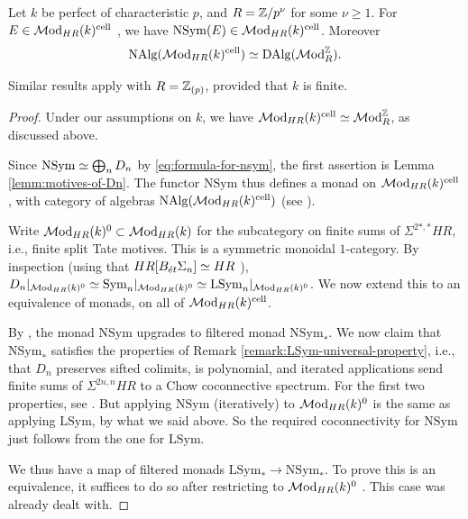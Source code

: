 \documentclass{amsart}
\renewcommand{\NB}[1]{}
\numberwithin{proposition}{section}
\numberwithin{equation}{section}
\def\cell{\mathrm{cell}}
\def\NSym{\mathrm{NSym}}
\def\LSym{\mathrm{LSym}}
\def\Sym{\mathrm{Sym}}
\def\DAlg{\mathrm{DAlg}}
\begin{document}
\begin{proposition} \label{prop:NAlg-DAlg}
Let $k$ be perfect of characteristic $p$, and $R=\mathbb{Z}/p^\nu$ for some $\nu \ge 1$.
For $E \in \Mod_{HR}(k)^\cell$ , we have $\NSym(E) \in \Mod_{HR}(k)^\cell$.
Moreover \[ \NAlg(\Mod_{HR}(k)^\cell) \wequi \DAlg(\Mod_{R}^\Z). \]

Similar results apply with $R=\mathbb{Z}_{(p)}$, provided that $k$ is finite.
\end{proposition}
\begin{proof}
Under our assumptions on $k$, we have $\Mod_{HR}(k)^\cell \wequi \Mod_{R}^\Z$, as discussed above.

Since $\NSym \wequi \bigoplus_n D_n$ by \eqref{eq:formula-for-nsym}, the first assertion is Lemma \ref{lemm:motives-of-Dn}.
The functor $\NSym$ thus defines a monad on $\Mod_{HR}(k)^\cell$, with category of algebras $\NAlg(\Mod_{HR}(k)^\cell)$ (see \cite[Theorem~4.7.3.5]{lurie-ha}).

Write $\mathcal{M}\mathrm{od}_{HR}(k)^0 \subset \mathcal{M}\mathrm{od}_{HR}(k)$ for the subcategory on finite sums of $\Sigma^{2*,*}HR$, i.e., finite split Tate motives.
This is a symmetric monoidal $1$-category.
By inspection (using that $HR[B_{\acute{e}t}\Sigma_n] \simeq HR$ \cite[Proposition 2.1(3)]{bachmann-linearity}), $D_n|_{\Mod_{HR}(k)^0} \wequi \Sym_n|_{\Mod_{HR}(k)^0} \wequi \LSym_n|_{\Mod_{HR}(k)^0}$.\NB{say more?}
We now extend this to an equivalence of monads, on all of $\Mod_{HR}(k)^\cell$.

By \cite[(proof of) Lemma 2.14]{bachmann-MHH}, the monad $\NSym$ upgrades to filtered monad $\NSym_*$.
We now claim that $\NSym_*$ satisfies the properties of Remark \ref{remark:LSym-universal-property}, i.e., that $D_n$ preserves sifted colimits, is polynomial, and iterated applications send finite sums of $\Sigma^{2n,n}HR$ to a Chow coconnective spectrum.
For the first two properties, see \cite[Example~5.12 and Corollary~5.33]{bachmann-colimits}.
But applying $\NSym$ (iteratively) to $\mathcal{M}\mathrm{od}_{HR}(k)^0$ is the same as applying $\LSym$, by what we said above.
So the required coconnectivity for $\NSym$ just follows from the one for $\LSym$.

We thus have a map of filtered monads $\LSym_* \to \NSym_*$.
To prove this is an equivalence, it suffices to do so after restricting to $\mathcal{M}\mathrm{od}_{HR}(k)^0$ \cite[Proposition 4.2.15]{raksit2020hochschild}.
This case was already dealt with.
\end{proof}
\end{document}
